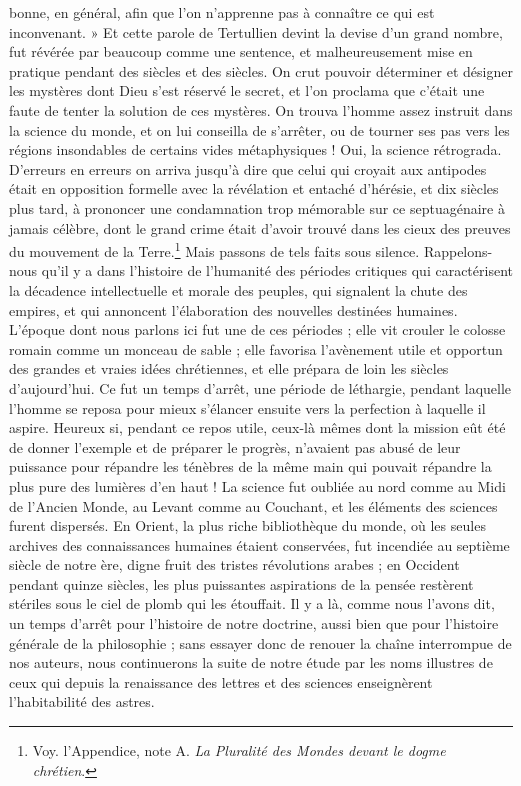 \documentclass[a4paper, 11pt, oneside]{article}
\begin{document}
bonne, en général, afin que l'on n'apprenne pas à connaître ce qui est inconvenant. » Et cette parole de Tertullien devint la devise d'un grand nombre, fut révérée par beaucoup comme une sentence, et malheureusement mise en pratique pendant des siècles et des siècles. On crut pouvoir déterminer et désigner les mystères dont Dieu s'est réservé le secret, et l'on proclama que c'était une faute de tenter la solution de ces mystères. On trouva l'homme assez instruit dans la science du monde, et on lui conseilla de s'arrêter, ou de tourner ses pas vers les régions insondables de certains vides métaphysiques ! Oui, la science rétrograda. D'erreurs en erreurs on arriva jusqu'à dire que celui qui croyait aux antipodes était en opposition formelle avec la révélation et entaché d'hérésie, et dix siècles plus tard, à prononcer une condamnation trop mémorable sur ce septuagénaire à jamais célèbre, dont le grand crime était d'avoir trouvé dans les cieux des preuves du mouvement de la Terre.\footnote{Voy. l'Appendice, note A. \emph{La Pluralité des Mondes devant le dogme chrétien}.} Mais passons de tels faits sous silence. Rappelons-nous qu'il y a dans l'histoire de l'humanité des périodes critiques qui caractérisent la décadence intellectuelle et morale des peuples, qui signalent la chute des empires, et qui annoncent l'élaboration des nouvelles destinées humaines. L'époque dont nous parlons ici fut une de ces périodes ; elle vit crouler le colosse romain comme un monceau de sable ; elle favorisa l'avènement utile et opportun des grandes et vraies idées chrétiennes, et elle prépara de loin les siècles d'aujourd'hui. Ce fut un temps d'arrêt, une période de léthargie, pendant laquelle l'homme se reposa pour mieux s'élancer ensuite vers la perfection à laquelle il aspire. Heureux si, pendant ce repos utile, ceux-là mêmes dont la mission eût été de donner l'exemple et de préparer le progrès, n'avaient pas abusé de leur puissance pour répandre les ténèbres de la même main qui pouvait répandre la plus pure des lumières d'en haut ! La science fut oubliée au nord comme au Midi de l'Ancien Monde, au Levant comme au Couchant, et les éléments des sciences furent dispersés. En Orient, la plus riche bibliothèque du monde, où les seules archives des connaissances humaines étaient conservées, fut incendiée au septième siècle de notre ère, digne fruit des tristes révolutions arabes ; en Occident pendant quinze siècles, les plus puissantes aspirations de la pensée restèrent stériles sous le ciel de plomb qui les étouffait. Il y a là, comme nous l'avons dit, un temps d'arrêt pour l'histoire de notre doctrine, aussi bien que pour l'histoire générale de la philosophie ; sans essayer donc de renouer la chaîne interrompue de nos auteurs, nous continuerons la suite de notre étude par les noms illustres de ceux qui depuis la renaissance des lettres et des sciences enseignèrent l'habitabilité des astres.
\clearpage
\end{document}

